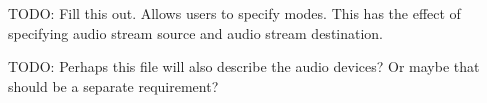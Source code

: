 TODO: Fill this out. Allows users to specify modes. This has the effect of specifying audio stream source and audio stream destination. 

TODO: Perhaps this file will also describe the audio devices? Or maybe that should be a separate requirement?